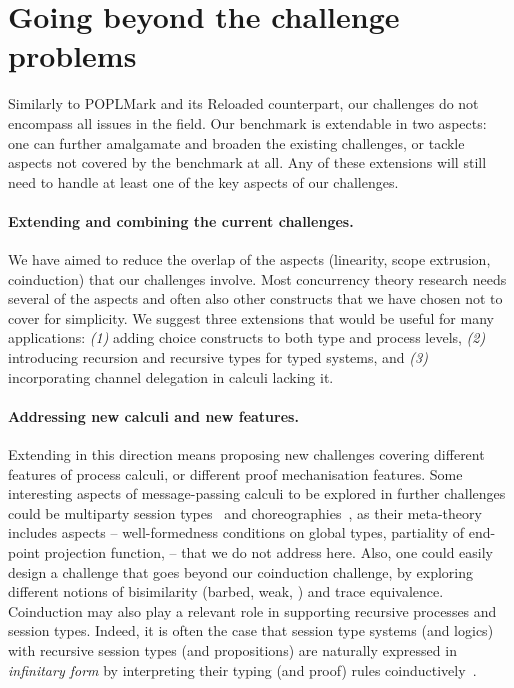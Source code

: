 \documentclass[runningheads]{llncs}
\begin{document}
\section{Going beyond the challenge problems}\label{sec:going-beyond}
Similarly to POPLMark and its Reloaded counterpart, our challenges do not encompass all issues in the field.
Our benchmark is extendable in two aspects: one can further amalgamate and broaden the existing challenges, or tackle aspects not covered by the benchmark at all.
Any of these extensions will still need to handle at least one of the key aspects of our challenges.

\paragraph{Extending and combining the current challenges.}
We have aimed to reduce the overlap of the aspects (linearity, scope extrusion, coinduction) that our challenges involve.
Most concurrency theory research needs several of the aspects and often also other constructs that we have chosen not to cover for simplicity.
We suggest three extensions that would be useful for many applications:
\emph{(1)} adding choice constructs to both type and process levels,
\emph{(2)} introducing recursion and recursive types for typed systems, and
\emph{(3)} incorporating channel delegation in calculi lacking it.

\paragraph{Addressing new calculi and new features.}
Extending in this direction means proposing new challenges covering different features of process calculi, or different proof mechanisation features.
Some interesting aspects of message-passing calculi to be explored in further challenges could be multiparty session types~\cite{10.1145/2827695} and choreographies~\cite{Carbone2013}, as their meta-theory includes aspects -- \eg well-formedness conditions on global types, partiality of end-point projection function, \etc -- that we do not address here.
Also, one could easily design a challenge that goes beyond our coinduction challenge, by exploring different notions of bisimilarity (barbed, weak, \etc) and trace equivalence.
%
Coinduction may also play a relevant role in supporting recursive processes and
session types. Indeed, it is often the case that session type systems (and
logics) with recursive session types (and propositions) are naturally expressed
in \emph{infinitary form} by interpreting their typing (and proof) rules
coinductively~\cite{BaeldeDoumaneSaurin16,DerakhshanPfenning22,HornePadovani23}.
\end{document}
